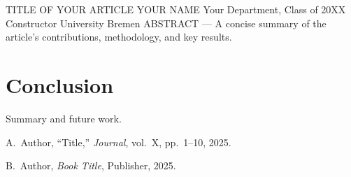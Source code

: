 %

\label{art:CHANGEME}

\articleheader
  {TITLE OF YOUR ARTICLE}
  {YOUR NAME}
  {Your Department, Class of 20XX\\Constructor University Bremen}
  {ABSTRACT --- A concise summary of the article's contributions,
   methodology, and key results.}






\section{Conclusion}

Summary and future work.

\articlereferences

\begin{enumerate}[label={[\arabic*]}, leftmargin=2em, itemsep=0.25em]
  \item A.~Author, ``Title,'' \textit{Journal}, vol.~X, pp.~1--10, 2025.
  \item B.~Author, \textit{Book Title}, Publisher, 2025.
\end{enumerate}
